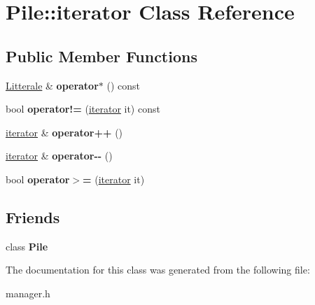 \hypertarget{class_pile_1_1iterator}{}\section{Pile\+:\+:iterator Class Reference}
\label{class_pile_1_1iterator}
\subsection*{Public Member Functions}
\begin{DoxyCompactItemize}
\item 
\hyperlink{class_litterale}{Litterale} \& {\bfseries operator$\ast$} () const \hypertarget{class_pile_1_1iterator_a5a84d0211e5cfb4ddb45661d7e940e87}{}\label{class_pile_1_1iterator_a5a84d0211e5cfb4ddb45661d7e940e87}

\item 
bool {\bfseries operator!=} (\hyperlink{class_pile_1_1iterator}{iterator} it) const \hypertarget{class_pile_1_1iterator_abfe0e25a2ebc5f3188c7a13f09d19129}{}\label{class_pile_1_1iterator_abfe0e25a2ebc5f3188c7a13f09d19129}

\item 
\hyperlink{class_pile_1_1iterator}{iterator} \& {\bfseries operator++} ()\hypertarget{class_pile_1_1iterator_a05b171f7019504d6fb1b6a9a183bd75b}{}\label{class_pile_1_1iterator_a05b171f7019504d6fb1b6a9a183bd75b}

\item 
\hyperlink{class_pile_1_1iterator}{iterator} \& {\bfseries operator-\/-\/} ()\hypertarget{class_pile_1_1iterator_a2885303b73c9f5aeaece13985d138773}{}\label{class_pile_1_1iterator_a2885303b73c9f5aeaece13985d138773}

\item 
bool {\bfseries operator$>$=} (\hyperlink{class_pile_1_1iterator}{iterator} it)\hypertarget{class_pile_1_1iterator_ae984b2c3b4144fbaad3f4e0540b3f9ab}{}\label{class_pile_1_1iterator_ae984b2c3b4144fbaad3f4e0540b3f9ab}

\end{DoxyCompactItemize}
\subsection*{Friends}
\begin{DoxyCompactItemize}
\item 
class {\bfseries Pile}\hypertarget{class_pile_1_1iterator_a77806361379cf369e95d2b4346c7e28a}{}\label{class_pile_1_1iterator_a77806361379cf369e95d2b4346c7e28a}

\end{DoxyCompactItemize}


The documentation for this class was generated from the following file\+:\begin{DoxyCompactItemize}
\item 
manager.\+h\end{DoxyCompactItemize}
